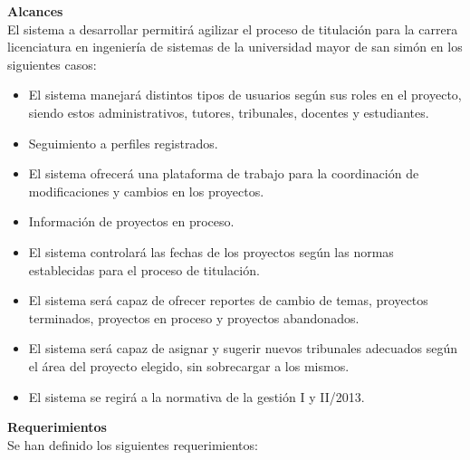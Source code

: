 \documentclass[10pt,letterpaper,twoside]{article}
\newcommand{\btext}[1]{
    \vspace{10mm}
    {{\textcolor{titlecolor}{\large{\textbf{\textsf{#1}}}}}}
    \vspace{5mm}
    \\
}
\begin{document}
\begin{multicols}{2}
\btext{Alcances}
El sistema a desarrollar permitirá agilizar el proceso de titulación para la carrera licenciatura en ingeniería de sistemas de la universidad mayor de san simón en los siguientes casos:
\begin{itemize}
    \item El sistema manejará distintos tipos de usuarios según sus roles en el proyecto, siendo estos administrativos, tutores, tribunales, docentes y estudiantes.
    \item Seguimiento a perfiles registrados.
    \item El sistema ofrecerá una plataforma de trabajo para la coordinación de modificaciones y cambios en los proyectos.
    \item Información de proyectos en proceso.
    \item El sistema controlará las fechas de los proyectos según las normas establecidas para el proceso de titulación.
    \item El sistema será capaz de ofrecer reportes de cambio de temas, proyectos terminados, proyectos en proceso y proyectos abandonados.
    \item El sistema será capaz de asignar y sugerir nuevos tribunales adecuados según el área del proyecto elegido, sin sobrecargar a los mismos.
    \item El sistema se regirá a la normativa de la gestión I y II/2013.
\end{itemize}

\btext{Requerimientos}
Se han definido los siguientes requerimientos:


\end{multicols}
\end{document}
